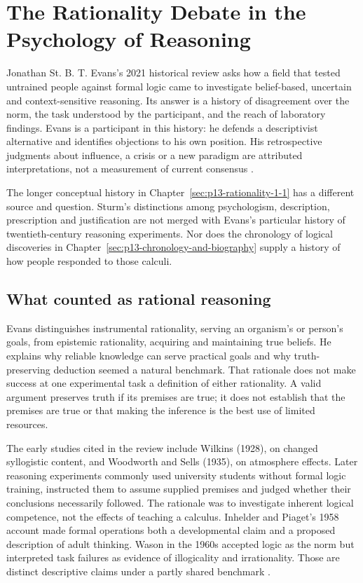 \chapter{The Rationality Debate in the Psychology of Reasoning}
\label{sec:p13-rationality-1-2}

Jonathan St. B. T. Evans's 2021 historical review asks how a field that tested
untrained people against formal logic came to investigate belief-based,
uncertain and context-sensitive reasoning.  Its answer is a history of
disagreement over the norm, the task understood by the participant, and the
reach of laboratory findings.  Evans is a participant in this history:
he defends a descriptivist alternative and identifies objections to his own
position.  His retrospective judgments about influence, a crisis or a new
paradigm are attributed interpretations, not a measurement of current consensus
\parencite[pp.~87--99]{Evans2021RationalityDebate}.

The longer conceptual history in Chapter~\ref{sec:p13-rationality-1-1}
has a different source and question.  Sturm's distinctions among
psychologism, description, prescription and justification are not merged
with Evans's particular history of twentieth-century reasoning experiments.
Nor does the chronology of logical discoveries in
Chapter~\ref{sec:p13-chronology-and-biography} supply a history of how people
responded to those calculi.

\section{What counted as rational reasoning}

Evans distinguishes instrumental rationality, serving an organism's or
person's goals, from epistemic rationality, acquiring and maintaining true
beliefs.  He explains why reliable knowledge can serve practical goals and
why truth-preserving deduction seemed a natural benchmark.  That rationale
does not make success at one experimental task a definition of either
rationality.  A valid argument preserves truth if its premises are true;
it does not establish that the premises are true or that making the inference
is the best use of limited resources.

The early studies cited in the review include Wilkins (1928), on changed
syllogistic content, and Woodworth and Sells (1935), on atmosphere effects.
Later reasoning experiments commonly used university students without formal
logic training, instructed them to assume supplied premises and judged whether
their conclusions necessarily followed.  The rationale was to investigate
inherent logical competence, not the effects of teaching a calculus.
Inhelder and Piaget's 1958 account made formal operations both a developmental
claim and a proposed description of adult thinking.  Wason in the 1960s
accepted logic as the norm but interpreted task failures as evidence of
illogicality and irrationality.  Those are distinct descriptive claims under
a partly shared benchmark \parencite[pp.~87--90]{Evans2021RationalityDebate}.

